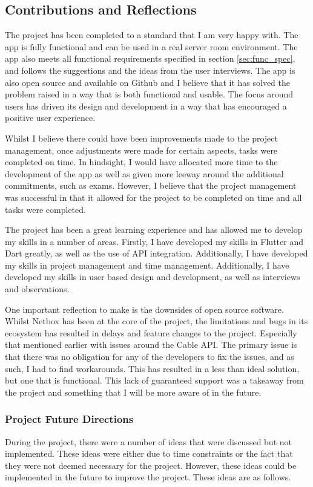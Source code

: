 \documentclass [11pt,a4paper]{article}
\begin{document}
\subsection{Contributions and Reflections}
\label{sec:reflections}

The project has been completed to a standard that I am very happy with. The app is fully functional and can be used in a real server room environment. The app also meets all functional requirements specified in section \ref{sec:func_spec}, and follows the suggestions and the ideas from the user interviews. The app is also open source and available on Github \cite{keeptrackgithub} and I believe that it has solved the problem raised in a way that is both functional and usable. The focus around users has driven its design and development in a way that has encouraged a positive user experience.

Whilst I believe there could have been improvements made to the project management, once adjustments were made for certain aspects, tasks were completed on time. In hindsight, I would have allocated more time to the development of the app as well as given more leeway around the additional commitments, such as exams. However, I believe that the project management was successful in that it allowed for the project to be completed on time and all tasks were completed. 

The project has been a great learning experience and has allowed me to develop my skills in a number of areas. Firstly, I have developed my skills in Flutter and Dart greatly, as well as the use of API integration. Additionally, I have developed my skills in project management and time management. Additionally, I have developed my skills in user based design and development, as well as interviews and observations. 

One important reflection to make is the downsides of open source software. Whilst Netbox has been at the core of the project, the limitations and bugs in its ecosystem has resulted in delays and feature changes to the project. Especially that mentioned earlier with issues around the Cable API. The primary issue is that there was no obligation for any of the developers to fix the issues, and as such, I had to find workarounds. This has resulted in a less than ideal solution, but one that is functional. This lack of guaranteed support was a takeaway from the project and something that I will be more aware of in the future.


\subsubsection{Project Future Directions}
\label{sec:future_directions}
During the project, there were a number of ideas that were discussed but not implemented. These ideas were either due to time constraints or the fact that they were not deemed necessary for the project. However, these ideas could be implemented in the future to improve the project. These ideas are as follows. 
\end{document}
